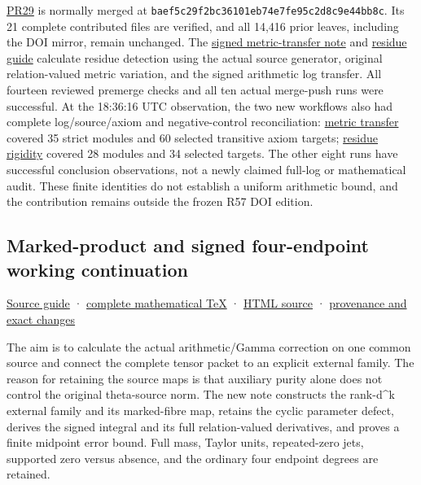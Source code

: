 \documentclass[
]{article}
\begin{document}
\href{https://github.com/KokunoYumeto/zeta-function-research-reader/pull/29}{PR29}
is normally merged at \texttt{baef5c29f2bc36101eb74e7fe95c2d8c9e44bb8c}.
Its 21 complete contributed files are verified, and all 14,416 prior
leaves, including the DOI mirror, remain unchanged. The
\href{workbenches/tau-arithmetic-metric-transfer/RESEARCH_NOTE.md}{signed
metric-transfer note} and
\href{workbenches/tau-residue-rigidity/README.md}{residue guide}
calculate residue detection using the actual source generator, original
relation-valued metric variation, and the signed arithmetic log
transfer. All fourteen reviewed premerge checks and all ten actual
merge-push runs were successful. At the 18:36:16 UTC observation, the
two new workflows also had complete log/source/axiom and
negative-control reconciliation:
\href{https://github.com/KokunoYumeto/zeta-function-research-reader/actions/runs/34774694650}{metric
transfer} covered 35 strict modules and 60 selected transitive axiom
targets;
\href{https://github.com/KokunoYumeto/zeta-function-research-reader/actions/runs/34774694642}{residue
rigidity} covered 28 modules and 34 selected targets. The other eight
runs have successful conclusion observations, not a newly claimed
full-log or mathematical audit. These finite identities do not establish
a uniform arithmetic bound, and the contribution remains outside the
frozen R57 DOI edition.

\subsection{Marked-product and signed four-endpoint working
continuation}\label{marked-product-and-signed-four-endpoint-working-continuation}

\href{workbenches/tau-marked-product-four-endpoint/README.md}{Source
guide} ·
\href{workbenches/tau-marked-product-four-endpoint/NOTE.tex}{complete
mathematical TeX} ·
\href{workbenches/tau-marked-product-four-endpoint/index.html}{HTML
source} ·
\href{workbenches/tau-marked-product-four-endpoint/PUBLIC_PROVENANCE.md}{provenance
and exact changes}

The aim is to calculate the actual arithmetic/Gamma correction on one
common source and connect the complete tensor packet to an explicit
external family. The reason for retaining the source maps is that
auxiliary purity alone does not control the original theta-source norm.
The new note constructs the rank-d\^{}k external family and its
marked-fibre map, retains the cyclic parameter defect, derives the
signed integral and its full relation-valued derivatives, and proves a
finite midpoint error bound. Full mass, Taylor units, repeated-zero
jets, supported zero versus absence, and the ordinary four endpoint
degrees are retained.
\end{document}
